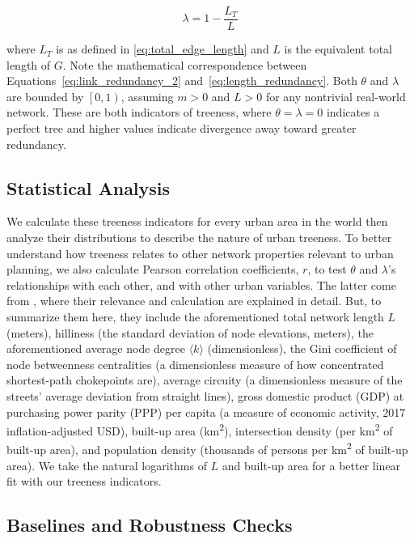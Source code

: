\documentclass[12pt,letterpaper]{article} %
\begin{document}
\begin{equation}
  \label{eq:length_redundancy}
  \lambda = 1 - \frac{L_T}{L}
\end{equation}

where $L_T$ is as defined in \autoref{eq:total_edge_length} and $L$ is the equivalent total length of $G$. Note the mathematical correspondence between Equations~\ref{eq:link_redundancy_2} and~\ref{eq:length_redundancy}. Both $\theta$ and $\lambda$ are bounded by
$\left[0, 1\right)$,  %
assuming $m > 0$ and $L > 0$ for any nontrivial real-world network. These are both indicators of treeness, where $\theta = \lambda = 0$ indicates a perfect tree and higher values indicate divergence away toward greater redundancy.

\subsection{Statistical Analysis}\label{sec:methods_analysis}

We calculate these treeness indicators for every urban area in the world then analyze their distributions to describe the nature of urban treeness. To better understand how treeness relates to other network properties relevant to urban planning, we also calculate Pearson correlation coefficients, $r$, to test $\theta$ and $\lambda$'s relationships with each other, and with other urban variables. The latter come from \citet{boeing_urban_2026}, where their relevance and calculation are explained in detail. But, to summarize them here, they include the aforementioned total network length $L$ (meters), hilliness (the standard deviation of node elevations, meters), the aforementioned average node degree $\langle k \rangle$ (dimensionless), the Gini coefficient of node betweenness centralities (a dimensionless measure of how concentrated shortest-path chokepoints are), average circuity (a dimensionless measure of the streets' average deviation from straight lines), gross domestic product (GDP) at purchasing power parity (PPP) per capita (a measure of economic activity, 2017 inflation-adjusted USD), built-up area (km\textsuperscript{2}), intersection density (per km\textsuperscript{2} of built-up area), and population density (thousands of persons per km\textsuperscript{2} of built-up area). We take the natural logarithms of $L$ and built-up area for a better linear fit with our treeness indicators.

\subsection{Baselines and Robustness Checks}
\end{document}
